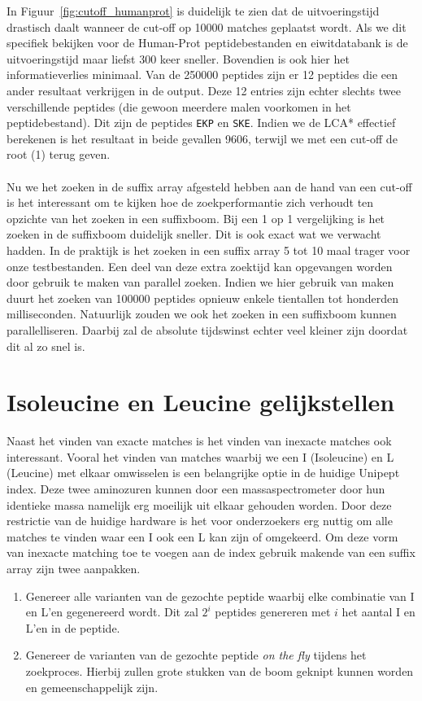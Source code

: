 In Figuur~\ref{fig:cutoff_humanprot} is duidelijk te zien dat de uitvoeringstijd drastisch daalt wanneer de cut-off op 10000 matches geplaatst wordt.
Als we dit specifiek bekijken voor de Human-Prot peptidebestanden en eiwitdatabank is de uitvoeringstijd maar liefst 300 keer sneller.
Bovendien is ook hier het informatieverlies minimaal.
Van de 250000 peptides zijn er 12 peptides die een ander resultaat verkrijgen in de output.
Deze 12 entries zijn echter slechts twee verschillende peptides (die gewoon meerdere malen voorkomen in het peptidebestand).
Dit zijn de peptides \texttt{EKP} en \texttt{SKE}.
Indien we de LCA* effectief berekenen is het resultaat in beide gevallen 9606, terwijl we met een cut-off de root (1) terug geven.
\\ \\
Nu we het zoeken in de suffix array afgesteld hebben aan de hand van een cut-off is het interessant om te kijken hoe de zoekperformantie zich verhoudt ten opzichte van het zoeken in een suffixboom.
Bij een 1 op 1 vergelijking is het zoeken in de suffixboom duidelijk sneller.
Dit is ook exact wat we verwacht hadden.
In de praktijk is het zoeken in een suffix array 5 tot 10 maal trager voor onze testbestanden.
Een deel van deze extra zoektijd kan opgevangen worden door gebruik te maken van parallel zoeken.
Indien we hier gebruik van maken duurt het zoeken van 100000 peptides opnieuw enkele tientallen tot honderden milliseconden.
Natuurlijk zouden we ook het zoeken in een suffixboom kunnen parallelliseren.
Daarbij zal de absolute tijdswinst echter veel kleiner zijn doordat dit al zo snel is.

\section{Isoleucine en Leucine gelijkstellen}\label{sec:isoleucine-en-leucine-equivalentie}
Naast het vinden van exacte matches is het vinden van inexacte matches ook interessant.
Vooral het vinden van matches waarbij we een I (Isoleucine) en L (Leucine) met elkaar omwisselen is een belangrijke optie in de huidige Unipept index.
Deze twee aminozuren kunnen door een massaspectrometer door hun identieke massa namelijk erg moeilijk uit elkaar gehouden worden.
Door deze restrictie van de huidige hardware is het voor onderzoekers erg nuttig om alle matches te vinden waar een I ook een L kan zijn of omgekeerd.
Om deze vorm van inexacte matching toe te voegen aan de index gebruik makende van een suffix array zijn twee aanpakken.
\begin{enumerate}
    \item Genereer alle varianten van de gezochte peptide waarbij elke combinatie van I en L'en gegenereerd wordt.
    Dit zal $2^i$ peptides genereren met $i$ het aantal I en L'en in de peptide.
    \item Genereer de varianten van de gezochte peptide \textit{on the fly} tijdens het zoekproces.
    Hierbij zullen grote stukken van de boom geknipt kunnen worden en gemeenschappelijk zijn.
\end{enumerate}

